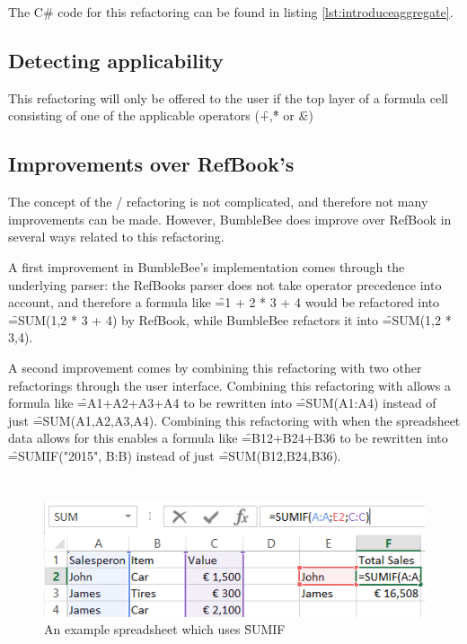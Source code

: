 The C\# code for this refactoring can be found in listing \ref{lst:introduceaggregate}.

\subsection{Detecting applicability}

This refactoring will only be offered to the user if the top layer of a formula cell consisting of one of the applicable operators (\f{+},\f{*} or \f{\&})

\newpage

\subsection{Improvements over RefBook's }

The concept of the / refactoring is not complicated, and therefore not many improvements can be made.
However, BumbleBee does improve over RefBook in several ways related to this refactoring.

A first improvement in BumbleBee's implementation comes through the underlying parser: the RefBooks parser does not take operator precedence into account, and therefore a formula like \f{=1 + 2 * 3 + 4} would be refactored into \f{=SUM(1,2 * 3 + 4)} by RefBook, while BumbleBee refactors it into \f{=SUM(1,2 * 3,4)}.

A second improvement comes by combining this refactoring with two other refactorings through the user interface.
Combining this refactoring with  allows a formula like \f{=A1+A2+A3+A4} to be rewritten into \f{=SUM(A1:A4)} instead of just \f{=SUM(A1,A2,A3,A4)}.
Combining this refactoring with  when the spreadsheet data allows for this enables a formula like \f{=B12+B24+B36} to be rewritten into \f{=SUMIF("2015", B:B)} instead of just \f{=SUM(B12,B24,B36)}.

\clearpage

\section{}
\label{refac:introduceconditionalaggregate}

\begin{figure}
	\centering
	\includegraphics{implementation/aggregate/sumifexample}
	\caption{An example spreadsheet which uses \f{SUMIF}}
	\label{fig:sumifexample}
\end{figure}

